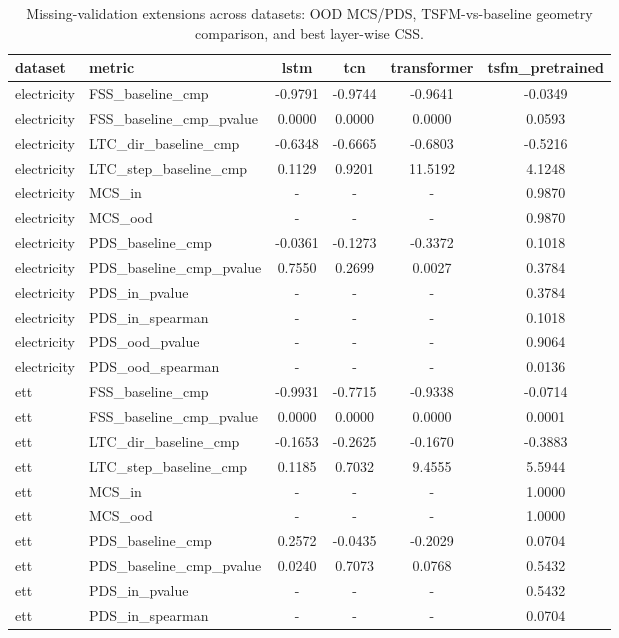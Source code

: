 \begin{table}[t]
\centering
\small
\caption{Missing-validation extensions across datasets: OOD MCS/PDS, TSFM-vs-baseline geometry comparison, and best layer-wise CSS.}
\label{tab:missing_validations_cross_dataset}
\begin{tabular}{l l c c c c}
\toprule
dataset & metric & lstm & tcn & transformer & tsfm_pretrained \\
\midrule
electricity & FSS_baseline_cmp & -0.9791 & -0.9744 & -0.9641 & -0.0349 \\
electricity & FSS_baseline_cmp_pvalue & 0.0000 & 0.0000 & 0.0000 & 0.0593 \\
electricity & LTC_dir_baseline_cmp & -0.6348 & -0.6665 & -0.6803 & -0.5216 \\
electricity & LTC_step_baseline_cmp & 0.1129 & 0.9201 & 11.5192 & 4.1248 \\
electricity & MCS_in & - & - & - & 0.9870 \\
electricity & MCS_ood & - & - & - & 0.9870 \\
electricity & PDS_baseline_cmp & -0.0361 & -0.1273 & -0.3372 & 0.1018 \\
electricity & PDS_baseline_cmp_pvalue & 0.7550 & 0.2699 & 0.0027 & 0.3784 \\
electricity & PDS_in_pvalue & - & - & - & 0.3784 \\
electricity & PDS_in_spearman & - & - & - & 0.1018 \\
electricity & PDS_ood_pvalue & - & - & - & 0.9064 \\
electricity & PDS_ood_spearman & - & - & - & 0.0136 \\
ett & FSS_baseline_cmp & -0.9931 & -0.7715 & -0.9338 & -0.0714 \\
ett & FSS_baseline_cmp_pvalue & 0.0000 & 0.0000 & 0.0000 & 0.0001 \\
ett & LTC_dir_baseline_cmp & -0.1653 & -0.2625 & -0.1670 & -0.3883 \\
ett & LTC_step_baseline_cmp & 0.1185 & 0.7032 & 9.4555 & 5.5944 \\
ett & MCS_in & - & - & - & 1.0000 \\
ett & MCS_ood & - & - & - & 1.0000 \\
ett & PDS_baseline_cmp & 0.2572 & -0.0435 & -0.2029 & 0.0704 \\
ett & PDS_baseline_cmp_pvalue & 0.0240 & 0.7073 & 0.0768 & 0.5432 \\
ett & PDS_in_pvalue & - & - & - & 0.5432 \\
ett & PDS_in_spearman & - & - & - & 0.0704 \\

\end{tabular}
\end{table}
